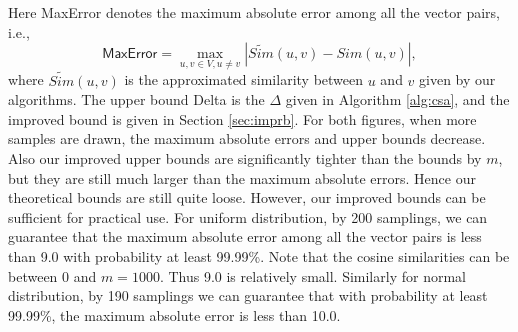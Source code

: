 \documentclass{article}
\begin{document}
Here \textsf{MaxError} denotes the maximum absolute error among all the vector pairs, i.e.,
$$\textsf{MaxError} = \max_{u,v\in V,u\not= v} |\widetilde{Sim}(u,v) - Sim(u,v)|,$$
where $\widetilde{Sim}(u,v)$ is the approximated similarity between $u$ and $v$ given by our algorithms. The upper bound \textsf{Delta} is the $\Delta$ given in Algorithm \ref{alg:csa}, and the improved bound is given in Section \ref{sec:imprb}.
For both figures, when more samples are drawn, the maximum absolute errors and upper bounds decrease. Also our improved upper bounds are significantly tighter than the bounds by $m$, but they are still much larger than the maximum absolute errors. Hence our theoretical bounds are still quite loose. However, our improved bounds can be sufficient for practical use. For uniform distribution, by 200 samplings, we can guarantee that the maximum absolute error among all the vector pairs is less than 9.0 with probability at least 99.99\%. Note that the cosine similarities can be between 0 and $m=1000$. Thus 9.0 is relatively small. Similarly for normal distribution, by 190 samplings we can guarantee that with probability at least 99.99\%, the maximum absolute error is less than 10.0.
\end{document}
